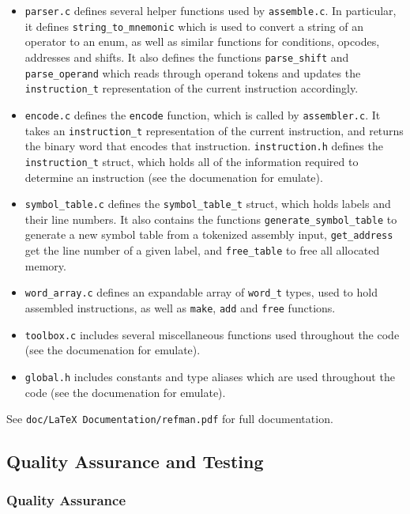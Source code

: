 \documentclass[10pt]{article}
\begin{document}
\begin{itemize}
\item \texttt{parser.c} defines several helper functions used by \texttt{assemble.c}. In particular, it defines \texttt{string\_to\_mnemonic} which is used to convert a string of an operator to an enum, as well as similar functions for conditions, opcodes, addresses and shifts. It also defines the functions \texttt{parse\_shift} and \texttt{parse\_operand} which reads through operand tokens and updates the \texttt{instruction\_t} representation of the current instruction accordingly.
\item \texttt{encode.c} defines the \texttt{encode} function, which is called by \texttt{assembler.c}. It takes an \texttt{instruction\_t} representation of the current instruction, and returns the binary word that encodes that instruction. \texttt{instruction.h} defines the \texttt{instruction\_t} struct, which holds all of the information required to determine an instruction (see the documenation for emulate).
\item \texttt{symbol\_table.c} defines the \texttt{symbol\_table\_t} struct, which holds labels and their line numbers. It also contains the functions \texttt{generate\_symbol\_table} to generate a new symbol table from a tokenized assembly input, \texttt{get\_address} get the line number of a given label, and \texttt{free\_table} to free all allocated memory.
\item \texttt{word\_array.c} defines an expandable array of \texttt{word\_t} types, used to hold assembled instructions, as well as \texttt{make}, \texttt{add} and \texttt{free} functions.
\item \texttt{toolbox.c} includes several miscellaneous functions used throughout the code (see the documenation for emulate). 
\item \texttt{global.h} includes constants and type aliases which are used throughout the code (see the documenation for emulate).
\end{itemize}

See \texttt{doc/LaTeX Documentation/refman.pdf} for full documentation.

\subsection{Quality Assurance and Testing}

\subsubsection{Quality Assurance}
\end{document}
